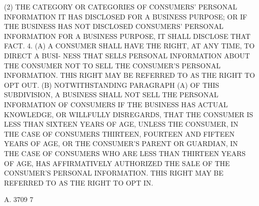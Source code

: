  (2) THE CATEGORY OR CATEGORIES OF CONSUMERS' PERSONAL INFORMATION IT HAS
 DISCLOSED  FOR  A BUSINESS PURPOSE; OR IF THE BUSINESS HAS NOT DISCLOSED
 CONSUMERS'  PERSONAL  INFORMATION  FOR  A  BUSINESS  PURPOSE,  IT  SHALL
 DISCLOSE THAT FACT.
   4. (A) A CONSUMER SHALL HAVE THE RIGHT, AT ANY TIME, TO DIRECT A BUSI-
 NESS  THAT SELLS PERSONAL INFORMATION ABOUT THE CONSUMER NOT TO SELL THE
 CONSUMER'S PERSONAL INFORMATION. THIS RIGHT MAY BE REFERRED  TO  AS  THE
 RIGHT TO OPT OUT.
   (B)  NOTWITHSTANDING  PARAGRAPH  (A)  OF  THIS SUBDIVISION, A BUSINESS
 SHALL NOT SELL THE PERSONAL INFORMATION OF CONSUMERS IF THE BUSINESS HAS
 ACTUAL KNOWLEDGE, OR WILLFULLY DISREGARDS, THAT  THE  CONSUMER  IS  LESS
 THAN SIXTEEN YEARS OF AGE, UNLESS THE CONSUMER, IN THE CASE OF CONSUMERS
 THIRTEEN, FOURTEEN AND FIFTEEN YEARS OF AGE, OR THE CONSUMER'S PARENT OR
 GUARDIAN,  IN  THE CASE OF CONSUMERS WHO ARE LESS THAN THIRTEEN YEARS OF
 AGE, HAS AFFIRMATIVELY AUTHORIZED THE SALE OF  THE  CONSUMER'S  PERSONAL
 INFORMATION. THIS RIGHT MAY BE REFERRED TO AS THE RIGHT TO OPT IN.

 A. 3709                             7
 
